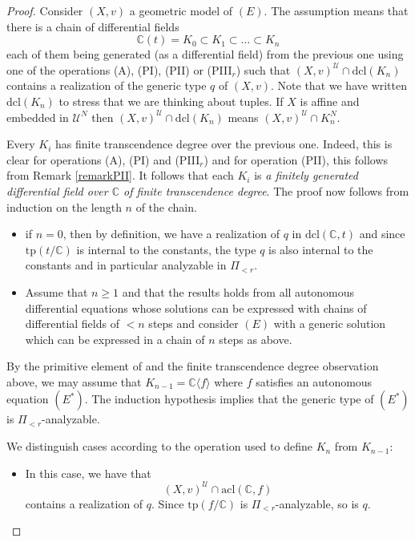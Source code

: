 \documentclass[12pt]{amsart}
\newcommand{\U}{\mathcal{U}}
\theoremstyle{definition}
\theoremstyle{plain}
\theoremstyle{exampstyle}
\theoremstyle{exampstyle}\newtheorem{thmxbis}{Theorem}
\numberwithin{equation}{section}
\theoremstyle{remark}
\begin{document}
\begin{proof}
Consider $(X,v)$ a geometric model of $(E)$. The assumption means that there is a chain of differential fields
$$  \mathbb{C}(t) = K_0 \subset K_1 \subset \ldots \subset K_n$$
each of them being generated (as a differential field) from the previous one using one of the operations (A), (PI), (PII) or (PIII$_r$) such that 
$(X,v)^\U \cap \mathrm{dcl}(K_n) $
contains a realization of the generic type $q$ of $(X,v)$. Note that we have written $\mathrm{dcl}(K_n)$ to stress that we are thinking about tuples. If $X$ is affine and embedded in $\U^N$ then $(X,v)^\U \cap \mathrm{dcl}(K_n)$ means $(X,v)^\U \cap K_n^N$.


Every $K_i$ has finite transcendence degree over the previous one. Indeed, this is clear for operations (A), (PI) and (PIII$_r$) and for operation (PII), this follows from Remark \ref{remarkPII}. It follows that each $K_i$ is {\em a finitely generated differential field over $\mathbb{C}$ of finite transcendence degree}. The proof now follows from induction on the length $n$ of the chain. 
\begin{itemize} 
\item if $n = 0$, then by definition, we have a realization of $q$ in 
$\mathrm{dcl}(\mathbb{C},t)$ and since $\mathrm{tp}(t/\mathbb{C})$ is internal to the constants, the type $q$ is also internal to the constants and in particular analyzable in $\Pi_{<r}$. 

\item Assume that $n \geq 1$ and that the results holds from all autonomous differential equations whose solutions can be expressed with chains of differential fields of $< n$ steps and consider $(E)$ with a generic solution which can be expressed in a chain of $n$ steps as above. 
\end{itemize}
By the primitive element of \cite{Pogudin} and the finite transcendence degree observation above, we may assume that $K_{n - 1} = \mathbb{C} \langle f \rangle$  where $f$ satisfies an autonomous equation $(E^\ast)$. The induction hypothesis implies that the generic type of $(E^\ast)$ is $\Pi_{<r}$-analyzable.

We distinguish cases according to the operation used to define $K_n$ from $K_{n - 1}$: 

\begin{itemize} 

\item[(A)] In this case, we have that 
$$(X,v)^\U \cap \mathrm{acl}(\mathbb{C},f)$$    
contains a realization of $q$. Since $\mathrm{tp}(f/\mathbb{C})$ is $\Pi_{<r}$-analyzable, so is $q$. 


\end{itemize}
\end{proof}
\end{document}
